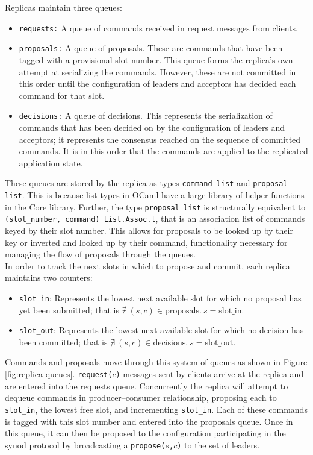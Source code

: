 Replicas maintain three queues: 
\begin{itemize}
  \item \texttt{requests:} A queue of commands received in request messages from clients.
  \item \texttt{proposals:} A queue of proposals. These are commands that have been tagged with a provisional slot number. This queue forms the replica's own attempt at serializing the commands. However, these are not committed in this order until the configuration of leaders and acceptors has decided each command for that slot.
  \item \texttt{decisions:} A queue of decisions. This represents the serialization of commands that has been decided on by the configuration of leaders and acceptors; it represents the consensus reached on the sequence of committed commands. It is in this order that the commands are applied to the replicated application state.
\end{itemize}

These queues are stored by the replica as types \texttt{command list} and \texttt{proposal list}. This is because list types in OCaml have a large library of helper functions in the Core library. Further, the type \texttt{proposal list} is structurally equivalent to \texttt{(slot\_number, command) List.Assoc.t}, that is an association list of commands keyed by their slot number. This allows for proposals to be looked up by their key or inverted and looked up by their command, functionality necessary for managing the flow of proposals through the queues. \\

In order to track the next slots in which to propose and commit, each replica maintains two counters:
\begin{itemize}
  \item \texttt{slot\_in}: Represents the lowest next available slot for which no proposal has yet been submitted; that is $\nexists  \ \left( s, c \right) \in \textrm{proposals}. \ s = \textrm{slot\_in}$.
  \item \texttt{slot\_out}: Represents the lowest next available slot for which no decision has been committed; that is $\nexists \ \left( s, c \right) \in \textrm{decisions}. \ s = \textrm{slot\_out}$.
\end{itemize}

Commands and proposals move through this system of queues as shown in Figure \ref{fig:replica-queues}. \texttt{request($c$)} messages sent by clients arrive at the replica and are entered into the requests queue. Concurrently the replica will attempt to dequeue commands in producer--consumer relationship, proposing each to \texttt{slot\_in}, the lowest free slot, and incrementing \texttt{slot\_in}. Each of these commands is tagged with this slot number and entered into the proposals queue. Once in this queue, it can then be proposed to the configuration participating in the synod protocol by broadcasting a \texttt{propose($s$,$c$)} to the set of leaders. \\


